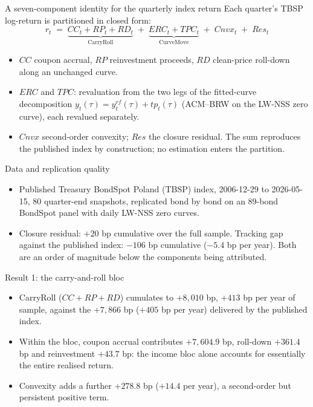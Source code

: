\documentclass[aspectratio=169,11pt]{beamer}
\begin{document}
\begin{frame}{A seven-component identity for the quarterly index return}
  \small Each quarter's TBSP log-return is partitioned in closed form:
  \[ r_t \;=\; \underbrace{CC_t + RP_t + RD_t}_{\text{CarryRoll}}
     \;+\; \underbrace{ERC_t + TPC_t}_{\text{CurveMove}}
     \;+\; Cnvx_t \;+\; Res_t \]
  \begin{itemize}
    \item $CC$ coupon accrual, $RP$ reinvestment proceeds, $RD$ clean-price
          roll-down along an unchanged curve.
    \item $ERC$ and $TPC$: revaluation from the two legs of the fitted-curve
          decomposition \( y_t(\tau) = y^{rf}_t(\tau) + tp_t(\tau) \)
          (ACM--BRW on the LW-NSS zero curve), each revalued separately.
    \item $Cnvx$ second-order convexity; $Res$ the closure residual. The sum
          reproduces the published index by construction; no estimation enters
          the partition.
  \end{itemize}
\end{frame}

\begin{frame}{Data and replication quality}
  \begin{itemize}
    \item Published Treasury BondSpot Poland (TBSP) index, 2006-12-29 to
          2026-05-15, 80 quarter-end snapshots, replicated bond by bond on an
          89-bond BondSpot panel with daily LW-NSS zero curves.
    \item Closure residual: $+20$ bp cumulative over the full sample.
          Tracking gap against the published index: $-106$ bp cumulative
          ($-5.4$ bp per year). Both are an order of magnitude below the
          components being attributed.
  \end{itemize}
\end{frame}

\begin{frame}{Result 1: the carry-and-roll bloc}
  \begin{itemize}
    \item CarryRoll ($CC+RP+RD$) cumulates to $+8{,}010$ bp, $+413$ bp per
          year of sample, against the $+7{,}866$ bp ($+405$ bp per year)
          delivered by the published index.
    \item Within the bloc, coupon accrual contributes $+7{,}604.9$ bp,
          roll-down $+361.4$ bp and reinvestment $+43.7$ bp: the income bloc
          alone accounts for essentially the entire realised return.
    \item Convexity adds a further $+278.8$ bp ($+14.4$ per year), a
          second-order but persistent positive term.
  \end{itemize}
\end{frame}
\end{document}
